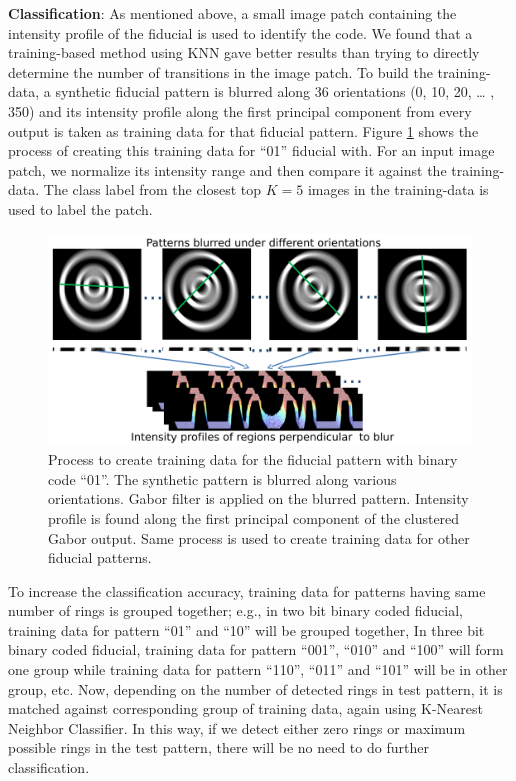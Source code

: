 \documentclass[runningheads]{llncs}
\begin{document}
\noindent\textbf{Classification}: As mentioned above, a small image patch containing
the intensity profile of the fiducial is used to identify the code.   We found
that a training-based method using KNN gave better results than trying to directly determine
the number of transitions in the image patch.  To build the training-data, a
synthetic fiducial pattern is blurred along 36 orientations (0, 10, 20, \ldots
, 350) and its intensity profile along the first principal component from every
output is taken as training data for that fiducial pattern. Figure
\ref{fig:training_data} shows the process of creating this training data for
``01'' fiducial with.  For an input image patch, we normalize its intensity
range and then compare it against the training-data. The class label from the
closest top $K=5$ images in the training-data is used to label the patch.

\begin{figure}[h!]
\centering
  \includegraphics[width=\linewidth]{training_data.pdf}
  \caption{Process to create training data for the fiducial pattern with binary
  code ``01''. The synthetic pattern is blurred along various orientations. Gabor
  filter is applied on the blurred pattern. Intensity profile is found along the
  first principal component of the clustered Gabor output. Same process is used
  to create training data for other fiducial patterns.}
  \label{fig:training_data}
\end{figure}

To increase the classification accuracy, training data for patterns having same
number of rings is grouped together; e.g., in two bit binary coded fiducial,
training data for pattern ``01'' and ``10'' will be grouped together, In three
bit binary coded fiducial, training data for pattern ``001'', ``010'' and
``100'' will form one group while training data for pattern ``110'', ``011'' and
``101'' will be in other group, etc. Now, depending on the number of detected
rings in test pattern, it is matched against corresponding group of training data, again
using  K-Nearest Neighbor Classifier. In this way, if we detect either zero
rings or maximum possible rings in the test pattern, there will be no need to do
further classification.
\end{document}
